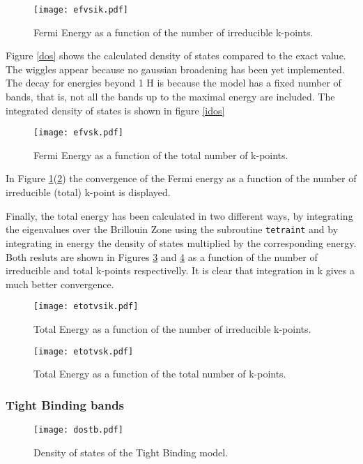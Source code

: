 \begin{figure}[h]
\texttt{[image: efvsik.pdf]}
\caption{Fermi Energy as a function of the number of irreducible k-points.
} \label{efvsik}
\end{figure}


Figure \ref{dos} shows the calculated density of states compared to the
exact value. The wiggles appear because no gaussian broadening has been
yet implemented. The decay for energies beyond 1 H is because the model
has a fixed number of bands, that is, not all the bands up to the maximal
energy are included. The integrated density of states is shown in figure
\ref{idos}

\begin{figure}[h]
\texttt{[image: efvsk.pdf]}
\caption{Fermi Energy as a function of the total number of k-points.
} \label{efvsk}
\end{figure}
  
In Figure \ref{efvsik}(\ref{efvsk}) the convergence of the Fermi energy as a function of
the number of irreducible (total) k-point is displayed. 

Finally, the total energy has been calculated in two different ways, by
integrating the eigenvalues over the Brillouin Zone using the subroutine
\verb"tetraint" and by integrating in energy the density of states multiplied by the
corresponding energy. Both resluts are shown in Figures \ref{etotvsik} and
\ref{etotvsk} as a function of the number of irreducible and total
k-points respectivelly. It is clear that integration in k gives a much
better convergence.


\begin{figure}[h]
\texttt{[image: etotvsik.pdf]}
\caption{Total Energy as a function of the number of irreducible k-points.
} \label{etotvsik}
\end{figure}

\begin{figure}[h]
\texttt{[image: etotvsk.pdf]}
\caption{Total Energy as a function of the total number of k-points.
} \label{etotvsk}
\end{figure}


\subsubsection{Tight Binding bands}

\begin{center}
\begin{figure}[h]
\texttt{[image: dostb.pdf]}
\caption{Density of states of the Tight Binding model.} \label{dostb}
\end{figure}
\end{center}

